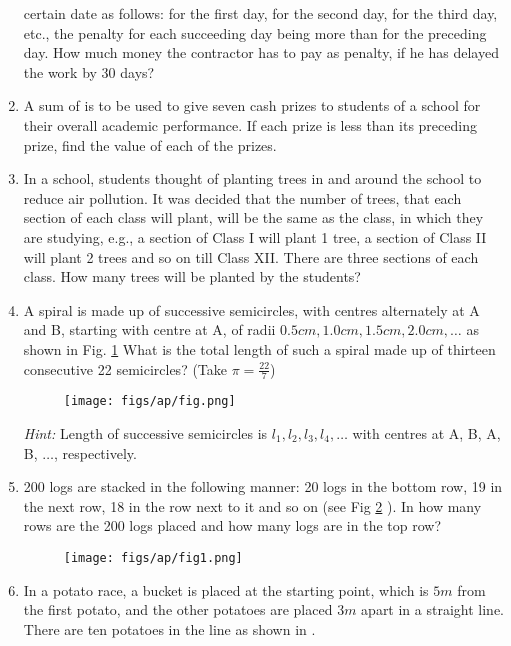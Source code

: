 \begin{enumerate}[label=\thesubsection.\arabic*, ref=\thesubsection.\theenumi]
certain date as follows:  for the first day,  for the second day,   for the third
day,  etc.,  the penalty for each succeeding day being  more than for the preceding day. How much money the contractor has to pay as penalty,  if he has delayed the work by 30 days?
\item A sum of  is to be used to give seven cash prizes to students of a school for their overall academic performance. If each prize is  less than its preceding prize,  find the value of each of the prizes.
\item  In a school,  students thought of planting trees in and around the school to reduce air pollution. It was decided that the number of trees,  that each section of each class will plant,  will be the same as the class,  in which they are studying,  
e.g.,  a section of Class I will plant 1 tree,  
a section of Class II will plant 2 trees and so on till Class XII. There are three sections of each class. How many trees will be planted by the students?
\item A spiral is made up of successive semicircles,  with centres alternately at A and B,  starting with centre at A,  of radii $0.5 cm,  1.0 cm,  1.5 cm,  2.0 cm, \dots $  as shown in Fig.
		\ref{fig:fig}
	What is the total length of such a spiral made up of thirteen consecutive 22 semicircles? (Take $\pi =\frac{22}{7}$)
	\begin{figure}[H]
		\centering
\texttt{[image: figs/ap/fig.png]} 
		\caption{}
		\label{fig:fig}
	\end{figure}
{\em Hint:} Length of successive semicircles is $l_1,  l_2,  l_3,  l_4 ,  \dots$ with centres at A,  B,  A,  B,  $\dots $, respectively.
\item 200 logs are stacked in the following manner: 20 logs in the bottom row,  19 in the next row,  18 in the row next to it and so on (see Fig
		\ref{fig:fig1}
	). In how many rows are the 200 logs placed and how many logs are in the top row?
	\begin{figure}[H]
		\centering
\texttt{[image: figs/ap/fig1.png]}
		\caption{}
		\label{fig:fig1}
	\end{figure}
\item In a potato race,  a bucket is placed at the starting point,  which is $5m$ from the first potato,  and the other potatoes are placed $3m$ apart in a straight line. There are ten potatoes in the line
		as shown in .
	\begin{figure}[H]

\end{figure}
\end{enumerate}
